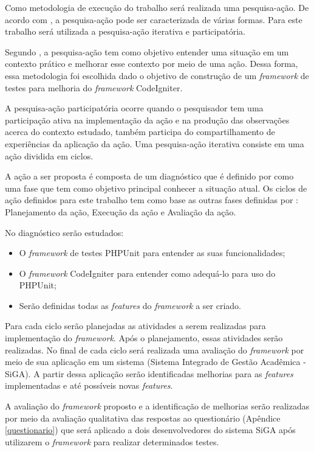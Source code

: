 Como metodologia de execução do trabalho será realizada uma pesquisa-ação. De acordo com , 
a pesquisa-ação pode ser caracterizada de várias formas. Para este trabalho será utilizada a pesquisa-ação iterativa e participatória.

Segundo , a pesquisa-ação tem como objetivo entender uma situação em um contexto prático e melhorar esse contexto por meio de uma ação.
Dessa forma, essa metodologia foi escolhida dado o objetivo de construção de um \textit{framework} de testes para melhoria do \textit{framework} CodeIgniter.

A pesquisa-ação participatória ocorre quando o pesquisador tem uma participação ativa na implementação da ação e na produção das observações acerca do contexto estudado, também participa do compartilhamento de experiências da aplicação da ação. Uma pesquisa-ação iterativa consiste em uma ação dividida em ciclos. \cite{artigo_pesquisa_acao}

A ação a ser proposta é composta de um diagnóstico que é definido por  como uma fase que tem como objetivo principal conhecer a situação atual. Os ciclos de ação definidos para este trabalho tem como base as outras fases definidas por : Planejamento da ação, Execução da ação e Avaliação da ação.

No diagnóstico serão estudados:
	\begin{itemize}
		\item O \textit{framework} de testes PHPUnit para entender as suas funcionalidades;
		\item O \textit{framework} CodeIgniter para entender como adequá-lo para uso do PHPUnit;
		\item Serão definidas todas as \textit{features} do \textit{framework} a ser criado.
	\end{itemize}

Para cada ciclo serão planejadas as atividades a serem realizadas para implementação do \textit{framework}.
Após o planejamento, essas atividades serão realizadas.
No final de cada ciclo será realizada uma avaliação do \textit{framework} por meio
de sua aplicação em um sistema (Sistema Integrado de Gestão Acadêmica - SiGA). A partir dessa aplicação serão identificadas
melhorias para as \textit{features} implementadas e até possíveis novas \textit{features}. 

A avaliação do \textit{framework} proposto e a identificação de melhorias serão realizadas por meio da avaliação qualitativa 
das respostas ao questionário (Apêndice \ref{questionario}) que será aplicado a dois desenvolvedores do sistema SiGA após utilizarem
o \textit{framework} para realizar determinados testes.
